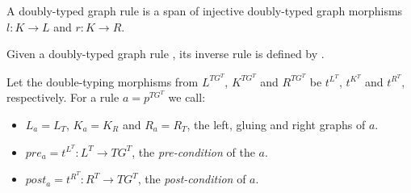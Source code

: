 \begin{definition} A doubly-typed graph rule \doublyTypedRule{} is a span of injective doubly-typed graph morphisms $l : K \rightarrow L$ and $r : K \rightarrow R$.


  Given a doubly-typed graph rule \doublyTypedRule{}, its inverse rule is defined by \inverseDoublyTypedRule{}.

  Let the double-typing morphisms from $L^{TG^T}$, $K^{TG^T}$ and $R^{TG^T}$ be $t^{L^T}$, $t^{K^T}$ and $t^{R^T}$, respectively. For a rule $a = p^{TG^T}$ we call:

  \begin{itemize}
    \item $L_a = L_T$, $K_a = K_R$ and $R_a = R_T$, the left, gluing and right graphs of $a$.
    \item $pre_a = t^{L^T} : L^T \rightarrow TG^T$, the \emph{pre-condition} of the $a$.
    \item $post_a = t^{R^T} : R^T \rightarrow TG^T$, the \emph{post-condition} of $a$.
  \end{itemize}

\end{definition}

